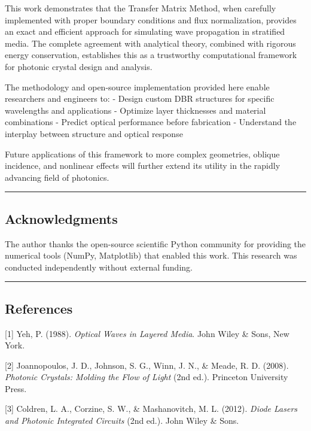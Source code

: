 \documentclass[
]{article}
\begin{document}
This work demonstrates that the Transfer Matrix Method, when carefully
implemented with proper boundary conditions and flux normalization,
provides an exact and efficient approach for simulating wave propagation
in stratified media. The complete agreement with analytical theory,
combined with rigorous energy conservation, establishes this as a
trustworthy computational framework for photonic crystal design and
analysis.

The methodology and open-source implementation provided here enable
researchers and engineers to: - Design custom DBR structures for
specific wavelengths and applications - Optimize layer thicknesses and
material combinations - Predict optical performance before fabrication -
Understand the interplay between structure and optical response

Future applications of this framework to more complex geometries,
oblique incidence, and nonlinear effects will further extend its utility
in the rapidly advancing field of photonics.

\begin{center}\rule{0.5\linewidth}{0.5pt}\end{center}

\subsection{Acknowledgments}\label{acknowledgments}

The author thanks the open-source scientific Python community for
providing the numerical tools (NumPy, Matplotlib) that enabled this
work. This research was conducted independently without external
funding.

\begin{center}\rule{0.5\linewidth}{0.5pt}\end{center}

\subsection{References}\label{references}

{[}1{]} Yeh, P. (1988). \emph{Optical Waves in Layered Media}. John
Wiley \& Sons, New York.

{[}2{]} Joannopoulos, J. D., Johnson, S. G., Winn, J. N., \& Meade, R.
D. (2008). \emph{Photonic Crystals: Molding the Flow of Light} (2nd
ed.). Princeton University Press.

{[}3{]} Coldren, L. A., Corzine, S. W., \& Mashanovitch, M. L. (2012).
\emph{Diode Lasers and Photonic Integrated Circuits} (2nd ed.). John
Wiley \& Sons.
\end{document}
